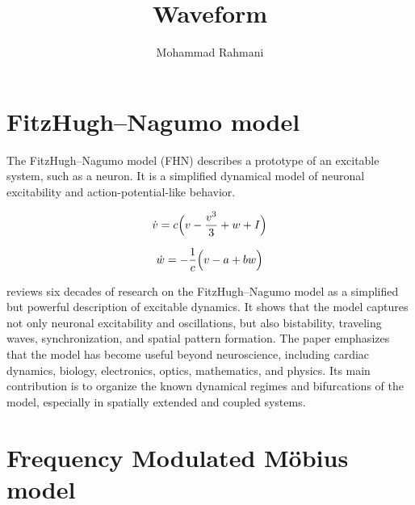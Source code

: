 \documentclass[a4paper]{article}
\title{Waveform}
\author{Mohammad Rahmani}
\date{}
\begin{document}
    \maketitle
    
    
    \section{FitzHugh--Nagumo model}
        
        The FitzHugh--Nagumo model (FHN)\cite{cebrian-lacasa-2025-six-decades-of-the-fitzhugh-nagumo-model-a-guide-through-its-spatio-temporal-dynamics-and-influence-across-disciplines} describes a prototype of an excitable system, such as a neuron.
        It is a simplified dynamical model of neuronal excitability and action-potential-like behavior.
        
        \begin{equation}
            \dot{v}
            =
            c
            \Bigl(
            v
            -
            \frac{v^{3}}{3}
            +
            w
            +
            I
            \Bigr)
        \end{equation}
        
        \begin{equation}
            \dot{w}
            =
            -
            \frac{1}{c}
            \Bigl(
            v
            -
            a
            +
            bw
            \Bigr)
        \end{equation}
        
        \cite{cebrian-lacasa-2025-six-decades-of-the-fitzhugh-nagumo-model-a-guide-through-its-spatio-temporal-dynamics-and-influence-across-disciplines}
        reviews six decades of research on the FitzHugh--Nagumo model as a simplified but powerful description of excitable dynamics.
        It shows that the model captures not only neuronal excitability and oscillations, but also bistability, traveling waves, synchronization, and spatial pattern formation.
        The paper emphasizes that the model has become useful beyond neuroscience, including cardiac dynamics, biology, electronics, optics, mathematics, and physics.
        Its main contribution is to organize the known dynamical regimes and bifurcations of the model, especially in spatially extended and coupled systems.
    
    
    \section{Frequency Modulated M\"obius model}
        
\end{document}
